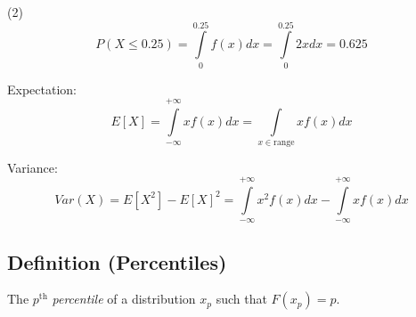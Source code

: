 (2)
\[  P(X\le 0.25)=
\int\limits_{0}^{0.25} f(x) d{x} =\int\limits_{0}^{0.25} 2x d{x} =0.625 \]

\begin{defbox}
    Expectation:
    \[ E[X]=\int\limits_{-\infty}^{+\infty} x f
(x) d{x} =
    \int\limits_{x\in\text{range}}^{} x f
(x) d{x}  \]
\end{defbox}

\begin{defbox}
    Variance:
    \[ Var(X)=E[X^2]-E[X]^2=\int\limits_{-\infty}^{+\infty} x^2f(x) d{x}-
    \int\limits_{-\infty}^{+\infty} x f
(x) d{x} \]
\end{defbox}

\begin{defbox}
    \subsection{Definition (Percentiles)}
    The $ p^\text{th} $ \emph{percentile} of a distribution $ x_p $ such that
    $ F(x_p)=p $.
\end{defbox}